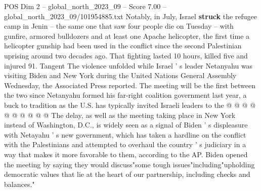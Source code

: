 \begin{textsample}{POS Dim 2 – global\_north\_2023\_09 – Score 7.00 – global\_north\_2023\_09/101954885.txt}
Notably, in July, Israel \textbf{struck} the refugee camp in Jenin -- the same one that saw four people die on Tuesday -- with gunfire, armored bulldozers and at least one Apache helicopter, the first time a helicopter gunship had been used in the conflict since the second Palestinian uprising around two decades ago.
That fighting lasted 10 hours, killed five and injured 91.
Tangent The violence unfolded while Israel ' s leader Netanyahu was visiting Biden and New York during the United Nations General Assembly Wednesday, the Associated Press reported.
The meeting will be the first between the two since Netanyahu formed his far-right coalition government last year, a buck to tradition as the U.S. has typically invited Israeli leaders to the @ @ @ @ @ @ @ @ @ @ The delay, as well as the meeting taking place in New York instead of Washington, D.C., is widely seen as a signal of Biden ' s displeasure with Netayahu ' s new government, which has taken a hardline on the conflict with the Palestinians and attempted to overhaul the country ' s judiciary in a way that makes it more favorable to them, according to the AP.
Biden opened the meeting by saying they would discuss"some tough issues"including"upholding democratic values that lie at the heart of our partnership, including checks and balances."

\end{textsample}
